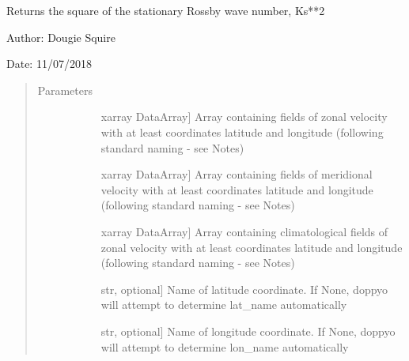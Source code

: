 \documentclass[letterpaper,10pt,english]{sphinxmanual}
\begin{document}
\begin{fulllineitems}
\end{fulllineitems}


\begin{fulllineitems}
\label{\detokenize{diagnostic_doc:diagnostic.Rossby_wave_number}}
Returns the square of the stationary Rossby wave number, Ks**2

\begin{DUlineblock}{0em}
\item[] Author: Dougie Squire
\item[] Date: 11/07/2018
\end{DUlineblock}
\begin{quote}\begin{description}
\item[{Parameters}] \leavevmode\begin{description}
\item[{}] \leavevmode{[}xarray DataArray{]}
Array containing fields of zonal velocity with at least coordinates latitude and longitude                     (following standard naming - see Notes)

\item[{}] \leavevmode{[}xarray DataArray{]}
Array containing fields of meridional velocity with at least coordinates latitude and                     longitude (following standard naming - see Notes)

\item[{}] \leavevmode{[}xarray DataArray{]}
Array containing climatological fields of zonal velocity with at least coordinates latitude                     and longitude (following standard naming - see Notes)

\item[{}] \leavevmode{[}str, optional{]}
Name of latitude coordinate. If None, doppyo will attempt to determine lat\_name                     automatically

\item[{}] \leavevmode{[}str, optional{]}
Name of longitude coordinate. If None, doppyo will attempt to determine lon\_name                     automatically


\end{description}
\end{description}
\end{quote}
\end{fulllineitems}
\end{document}
